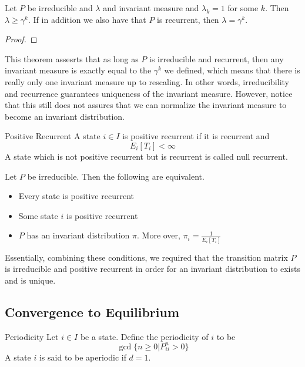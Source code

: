\documentclass[a4paper]{article}
\begin{document}
\begin{thm}{}{} Let $P$ be irreducible and $\lambda$ and invariant measure and $\lambda_k=1$ for some $k$. Then $\lambda\geq\gamma^k$. If in addition we also have that $P$ is recurrent, then $\lambda=\gamma^k$. \tcbline
\begin{proof}
\end{proof}
\end{thm}

This theorem assesrts that as long as $P$ is irreducible and recurrent, then any invariant measure is exactly equal to the $\gamma^k$ we defined, which means that there is really only one invariant measure up to rescaling. In other words, irreducibility and recurrence guarantees uniqueness of the invariant measure. However, notice that this still does not assures that we can normalize the invariant measure to become an invariant distribution. 

\begin{defn}{Positive Recurrent}{} A state $i\in I$ is positive recurrent if it is recurrent and $$E_i[T_i]<\infty$$ A state which is not positive recurrent but is recurrent is called null recurrent. 
\end{defn}

\begin{thm}{}{} Let $P$ be irreducible. Then the following are equivalent. 
\begin{itemize}
\item Every state is positive recurrent
\item Some state $i$ is positive recurrent
\item $P$ has an invariant distribution $\pi$. More over, $\pi_i=\frac{1}{E_i[T_i]}$
\end{itemize}
\end{thm}

Essentially, combining these conditions, we required that the transition matrix $P$ is irreducible and positive recurrent in order for an invariant distribution to exists and is unique. 

\subsection{Convergence to Equilibrium}
\begin{defn}{Periodicity}{} Let $i\in I$ be a state. Define the periodicity of $i$ to be $$\gcd\{n\geq 0|P_{ii}^n>0\}$$ A state $i$ is said to be aperiodic if $d=1$. 
\end{defn}
\end{document}
